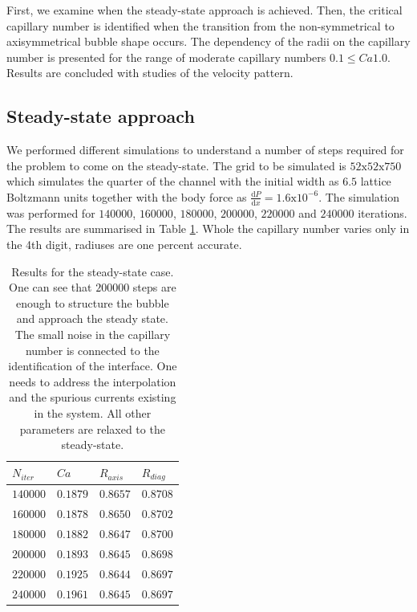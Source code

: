 \documentclass{article}
\begin{document}
First, we examine when the steady-state approach is
achieved. Then, the critical capillary number is identified when the transition from the
non-symmetrical to axisymmetrical bubble shape occurs. The dependency of the radii on the capillary
number is presented for the range of moderate capillary numbers $0.1 \leq Ca 1.0$. Results are
concluded with studies of the velocity pattern.

\subsection{Steady-state approach}
\label{sec:steady:state}
We performed different simulations to understand a number of steps required for the problem to come
on the steady-state. The grid to be simulated is $52\mathrm{x}52\mathrm{x}750$ which simulates the
quarter of the channel with the initial
width as $6.5$ lattice Boltzmann units together with the body force as
$\frac{\mathrm{d}P}{\mathrm{d}x}=1.6
\mathrm{x}10^{-6}$. The simulation was performed for $140000$, $160000$, $180000$, $200000$,
$220000$ and
$240000$ iterations. The results are summarised in Table \ref{table:steady:state}. Whole the
capillary number varies only in the 4th digit, radiuses are one percent accurate. 
\begin{table}
\begin{tabularx}{\textwidth}{|X|X|X|X|}
\hline
$N_{iter}$&$Ca$&$R_{axis}$&$R_{diag}$\\
\hline
$140000$&$0.1879$&$0.8657$&$0.8708$\\
$160000$&$0.1878$&$0.8650$&$0.8702$\\
$180000$&$0.1882$&$0.8647$&$0.8700$\\
$200000$&$0.1893$&$0.8645$&$0.8698$\\
$220000$&$0.1925$&$0.8644$&$0.8697$\\
$240000$&$0.1961$&$0.8645$&$0.8697$\\
\hline
\end{tabularx}
\caption{Results for the steady-state case. One
can see that $200000$ steps are enough to structure
the bubble and approach the steady state. The small noise in the capillary number is connected to
the identification of the interface. One needs to address the interpolation and the spurious
currents existing in the system. All other parameters are relaxed to the
steady-state.\label{table:steady:state}}
\end{table}
\end{document}
